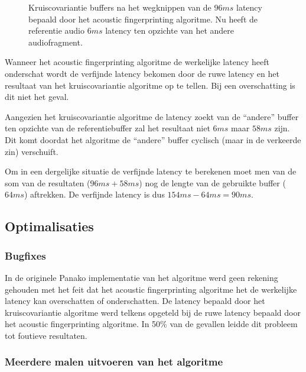 \begin{figure}[h!]
	\captionsetup{width=0.7\textwidth}
	\caption[Kruiscovariantie buffers]{Kruiscovariantie buffers na het wegknippen van de $ 96 ms $ latency bepaald door het acoustic fingerprinting algoritme. Nu heeft de referentie audio $ 6 ms $ latency ten opzichte van het andere audiofragment.   }
	\begin{center}
		\advance\parskip0.3cm
		
	\end{center}
	\label{crosscovariance2}
\end{figure}

Wanneer het acoustic fingerprinting algoritme de werkelijke latency heeft onderschat wordt de verfijnde latency bekomen door de ruwe latency en het resultaat van het kruiscovariantie algoritme op te tellen. Bij een overschatting is dit niet het geval.

Aangezien het kruiscovariantie algoritme de latency zoekt van de ``andere'' buffer ten opzichte van de referentiebuffer zal het resultaat niet $6 ms$ maar $ 58 ms $ zijn. Dit komt doordat het algoritme de ``andere'' buffer cyclisch (maar in de verkeerde zin) verschuift.

Om in een dergelijke situatie de verfijnde latency te berekenen moet men van de som van de resultaten ($96 ms + 58 ms$) nog de lengte van de gebruikte buffer ($ 64ms $) aftrekken. De verfijnde latency is dus $ 154 ms - 64 ms = 90 ms $.


\subsection{Optimalisaties}

\subsubsection{Bugfixes}

In de originele Panako implementatie van het algoritme werd geen rekening gehouden met het feit dat het acoustic fingerprinting algoritme het de werkelijke latency kan overschatten of onderschatten. De latency bepaald door het kruiscovariantie algoritme werd telkens opgeteld bij de ruwe latency bepaald door het acoustic fingerprinting algoritme. In 50\% van de gevallen leidde dit probleem tot foutieve resultaten.

\subsubsection{Meerdere malen uitvoeren van het algoritme}
\label{crosscovariance-repeated}

